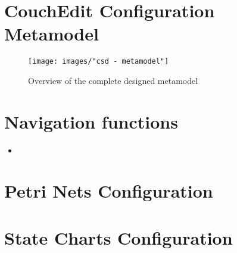 \chapter{CouchEdit Configuration Metamodel}
\begin{sidewaysfigure}
\centering
\texttt{[image: images/"csd - metamodel"]}
\caption{Overview of the complete designed metamodel}
\label{fig:complete-metamodel}
\end{sidewaysfigure}

\chapter{Navigation functions}
\label{app:navigationfunctions}
\begin{itemize}
  \item {}
\end{itemize}


\chapter{Petri Nets Configuration}


\chapter{State Charts Configuration}

